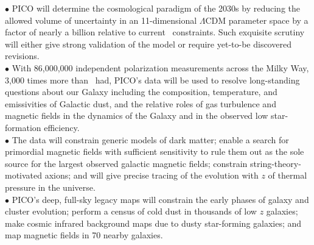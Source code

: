 \documentclass[PICOAPC.tex]{subfiles}
\begin{document}
$\bullet$ PICO will determine the cosmological paradigm of the 2030s by reducing the allowed volume of uncertainty in an 11-dimensional $ \Lambda$CDM parameter space by a factor of nearly a billion relative to current \planck\ constraints. %
Such exquisite scrutiny will either give strong validation of the model or require yet-to-be discovered revisions. \\
$\bullet$ With 86,000,000 independent polarization measurements across the Milky Way, 3,000 times more than \planck \ had, PICO's data will be used to resolve long-standing questions about our Galaxy including the 
composition, temperature, and emissivities of Galactic dust, and the relative roles of gas turbulence and magnetic fields in the dynamics of the Galaxy and in the observed low star-formation efficiency. \\
$\bullet$ The data will constrain generic models of dark matter; enable a search for primordial magnetic fields with sufficient sensitivity to rule them out as the sole source for the largest observed galactic magnetic fields; constrain string-theory-motivated axions; 
and will give precise tracing of the evolution with $z$ of thermal pressure in the universe. \\ 
$\bullet$ PICO's deep, full-sky legacy maps will constrain the early phases of galaxy and cluster evolution;  
perform a census of cold dust in thousands of low $z$ galaxies; make cosmic infrared background maps 
due to dusty star-forming galaxies; and map magnetic fields in 70 nearby galaxies. 
\end{document}
